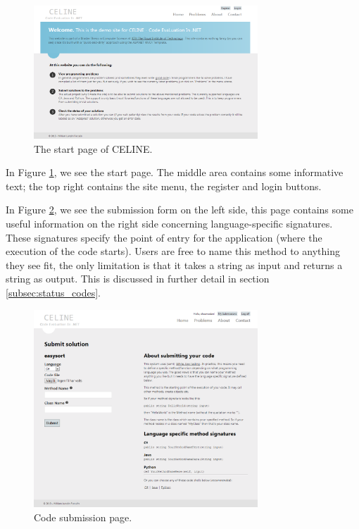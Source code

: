 \begin{figure}[h]
	\centering
	\includegraphics[width=0.75\textwidth]{chapters/media/celine_startpage.png}
	\caption{The start page of CELINE.}
	\label{fig:celine_startpage}
\end{figure}

In Figure \ref{fig:celine_startpage}, we see the start page. The middle area contains some informative text; the top right contains the site menu, the register and login buttons.

In Figure \ref{fig:celine_submit}, we see the submission form on the left side, this page contains some useful information on the right side concerning language-specific signatures. These signatures specify the point of entry for the application (where the execution of the code starts). Users are free to name this method to anything they see fit, the only limitation is that it takes a string as input and returns a string as output. This is discussed in further detail in section \ref{subsec:status_codes}.

\begin{figure}[h]
	\centering
	\includegraphics[width=0.75\textwidth]{chapters/media/celine_submit.png}
	\caption{Code submission page.}
	\label{fig:celine_submit}
\end{figure}


